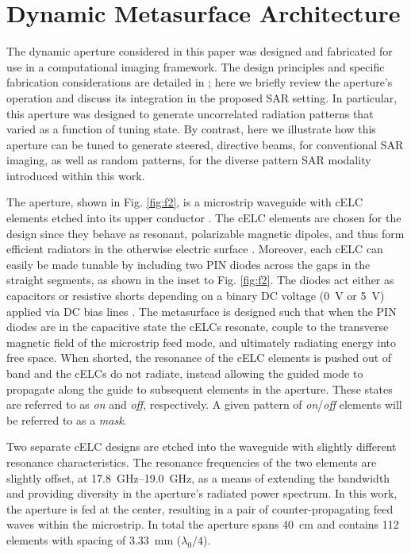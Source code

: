 \documentclass[journal]{IEEEtran}
\begin{document}
\section{Dynamic Metasurface Architecture}
\label{sec:sec2}

The dynamic aperture considered in this paper was designed and fabricated for use in a computational imaging framework. The design principles and specific fabrication considerations are detailed in \cite{sleasmanMarathon}; here we briefly review the aperture's operation and discuss its integration in the proposed SAR setting. In particular, this aperture was designed to generate uncorrelated radiation patterns that varied as a function of tuning state. By contrast, here we illustrate how this aperture can be tuned to generate steered, directive beams, for conventional SAR imaging, as well as random patterns, for the diverse pattern SAR modality introduced within this work.

The aperture, shown in Fig. \ref{fig:f2}, is a microstrip waveguide with cELC elements etched into its upper conductor \cite{hand2008cELC,sleasman2015element}. The cELC elements are chosen for the design since they behave as resonant, polarizable magnetic dipoles, and thus form efficient radiators in the otherwise electric surface \cite{landy2013WGhomogenization}. Moreover, each cELC can easily be made tunable by including two PIN diodes across the gaps in the straight segments, as shown in the inset to Fig. \ref{fig:f2}. The diodes act either as capacitors or resistive shorts depending on a binary DC voltage (\SI{0}{\volt} or \SI{5}{\volt}) applied via DC bias lines \cite{sleasman2015element}. The metasurface is designed such that when the PIN diodes are in the capacitive state the cELCs resonate, couple to the transverse magnetic field of the microstrip feed mode, and ultimately radiating energy into free space. When shorted, the resonance of the cELC elements is pushed out of band and the cELCs do not radiate, instead allowing the guided mode to propagate along the guide to subsequent elements in the aperture. These states are referred to as \emph{on} and \emph{off}, respectively. A given pattern of \emph{on}/\emph{off} elements will be referred to as a \emph{mask}.

Two separate cELC designs are etched into the waveguide with slightly different resonance characteristics. The resonance frequencies of the two elements are slightly offset, at \SIrange{17.8}{19.0}{\GHz}, as a means of extending the bandwidth and providing diversity in the aperture's radiated power spectrum. In this work, the aperture is fed at the center, resulting in a pair of counter-propagating feed waves within the microstrip. In total the aperture spans \SI{40}{\centi\meter} and contains 112 elements with spacing of \SI{3.33}{\milli\meter} ($\lambda_0/4$).
\end{document}

